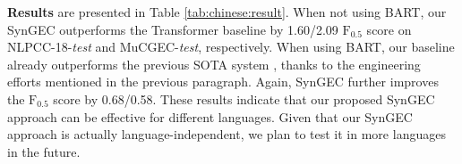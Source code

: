 \documentclass[11pt]{article}
\begin{document}
\begin{table}[tp!]
\centering
{}
\caption{Single-model results on Chinese datasets. }
\label{tab:chinese:result}
\end{table} 
\textbf{Results} are presented in Table \ref{tab:chinese:result}. When not using BART, our SynGEC outperforms the Transformer baseline by  1.60/2.09 $\mbox{F}_{0.5}$ score on NLPCC-18-\textit{test} and MuCGEC-\textit{test}, respectively. When using BART, our baseline already outperforms the previous SOTA system \citep{zhang2022mucgec}, thanks to the engineering efforts mentioned in the previous paragraph. Again, SynGEC further improves the $\mbox{F}_{0.5}$ score by 0.68/0.58. These results indicate that our proposed SynGEC approach can be effective for different languages. Given that our SynGEC approach is actually language-independent, we plan to test it in more languages in the future.
\end{document}
